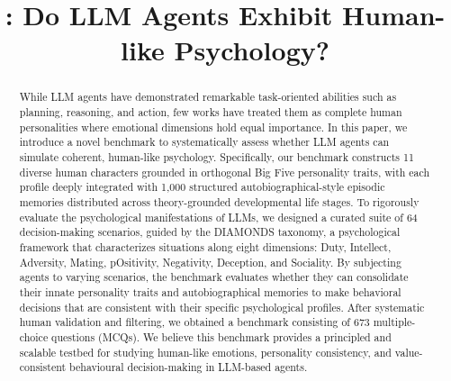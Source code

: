 \documentclass{article}
\title{\heartbenchicon \ourbench: Do LLM Agents Exhibit Human-like Psychology?}
\affiliation{1}{Shanghai Jiao Tong University}
\affiliation{2}{Imperial College London}
\affiliation{3}{Quwan Group}
\affiliation{4}{University of Washington}
\affiliation{5}{South China Normal University}
\begin{document}









\begin{abstract}
While LLM agents have demonstrated remarkable task-oriented abilities such as planning, reasoning, and action, few works have treated them as complete human personalities where emotional dimensions hold equal importance. In this paper, we introduce a novel benchmark to systematically assess whether LLM agents can simulate coherent, human-like psychology. Specifically, our benchmark constructs 11 diverse human characters grounded in orthogonal Big Five personality traits, with each profile deeply integrated with 1,000 structured autobiographical-style episodic memories distributed across theory-grounded developmental life stages. To rigorously evaluate the psychological manifestations of LLMs, we designed a curated suite of 64 decision-making scenarios, guided by the DIAMONDS taxonomy, a psychological framework that characterizes situations along eight dimensions: Duty, Intellect, Adversity, Mating, pOsitivity, Negativity, Deception, and Sociality. By subjecting agents to varying scenarios, the benchmark evaluates whether they can consolidate their innate personality traits and autobiographical memories to make behavioral decisions that are consistent with their specific psychological profiles. After systematic human validation and filtering, we obtained a benchmark consisting of 673 multiple-choice questions (MCQs). We believe this benchmark provides a principled and scalable testbed for studying human-like emotions, personality consistency, and value-consistent behavioural decision-making in LLM-based agents.
\end{abstract}
\end{document}
